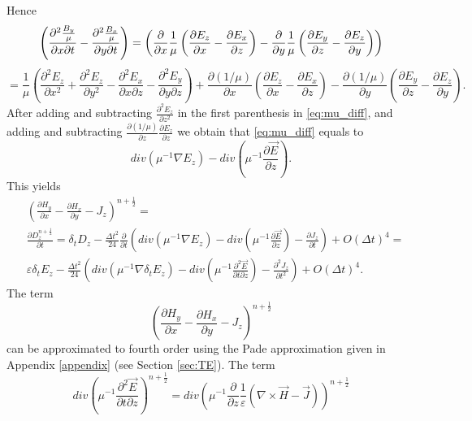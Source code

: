 \documentclass[12pt,reqno]{amsart}
\theoremstyle{definition}
\numberwithin{equation}{section}
\begin{document}
			Hence
			$$
			\left(\frac{\partial^2 {B_y \over \mu}}{\partial x \partial t}
			- \frac{\partial^2 {B_x \over \mu}}{\partial y \partial t}  \right)=
			\left (
			\frac{\partial}{\partial x} \frac{1}{\mu}\left (
			\frac{\partial E_z}{\partial x}-\frac{\partial E_x}{\partial z}
			\right)-\frac{\partial }{\partial y} \frac{1}{\mu}\left (
			\frac{\partial E_y}{\partial z}-\frac{\partial E_z}{\partial y}
			\right) 
			\right)
			$$
			\begin{equation}\label{eq:mu_diff}
				=\frac{1}{\mu}
				\left(
				\frac{\partial^2 E_z}{\partial x^2}
				+\frac{\partial^2 E_z}{\partial y^2}
				-\frac{\partial^2 E_x}{\partial x\partial z}
				-\frac{\partial^2 E_y}{\partial y\partial z}
				\right)+
				\frac{\partial (1/\mu)}{\partial x}\left ( \frac{\partial E_z}{\partial x}-\frac{\partial E_x}{\partial z}\right)
				-
				\frac{\partial (1/\mu)}{\partial y}\left ( \frac{\partial E_y}{\partial z}-\frac{\partial E_z}{\partial y}\right).
			\end{equation}
			After adding and subtracting $\frac{\partial^2 E_z  }{\partial z^2}$
			in the first parenthesis in \eqref{eq:mu_diff}, and adding and subtracting
			$\frac{\partial (1/\mu)}{\partial z}\frac{\partial E_z}{\partial z}$
			we obtain that  \eqref{eq:mu_diff} equals to
			$$
			div(\mu^{-1}\nabla E_z)-div(\mu^{-1}\frac{\partial \vec{E}}{\partial z}).
			$$
			This yields
			\begin{align*}
				&
				\left ( \frac{\partial H_y}{\partial x}-
				\frac{\partial H_x}{\partial y}-J_z
				\right)^{n+\frac{1}{2}}=\\&
				\frac{\partial D_z^{n+\frac{1}{2}}}{\partial t} =
				\delta_t D_z - \frac{\Delta t^2}{24} \frac{\partial}{\partial t}
				\left(
				div(\mu^{-1}\nabla E_z)-div(\mu^{-1}\frac{\partial \vec{E}}{\partial z})
				-\frac{\partial J_z}{\partial t}
				\right)+O(\Delta t	)^4= \\&
				\varepsilon \delta_t  E_z - \frac{\Delta t^2}{24}
				\left(
				div(\mu^{-1} \nabla \delta_t  E_z)
				- div\left (\mu^{-1}\frac{\partial ^2\vec{E}}{\partial t \partial z}
				\right)
				-\frac{\partial^2 J_z}{\partial t^2}
				\right)
				+O(\Delta t	)^4.
			\end{align*}
			The term 
			$$
			\left ( \frac{\partial H_y}{\partial x}-
			\frac{\partial H_x}{\partial y}-J_z
			\right)^{n+\frac{1}{2}}
			$$
			can be approximated to fourth order using the Pade approximation given in Appendix \ref{appendix} \cite{yefet_turkel}(see Section \ref{sec:TE}). 
			The term
			$$
			div\left(\mu^{-1}\frac{\partial^2\vec{E}}{\partial t \partial z}\right )^{n+\frac{1}{2}}
			=div\left(
			\mu^{-1}\frac{\partial }{ \partial z}\frac{1}{\varepsilon}(
			\nabla \times \vec{H} -\vec{J}
			)
			\right)^{n+\frac{1}{2}}
			$$
\end{document}

